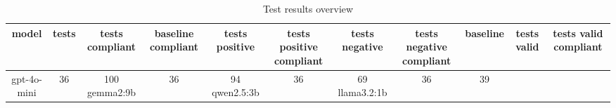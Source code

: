 
  \begin{table}[h!]
  \centering
  \begin{tabular}{|c|c|c|c|c|c|c|c|c|c|c|}
  \hline
  model & tests & tests compliant & baseline compliant & tests positive & tests positive compliant & tests negative & tests negative compliant & baseline & tests valid & tests valid compliant \\
  \hline
  gpt-4o-mini & 36 & 100%
\hline
gemma2:9b & 36 & 94%
\hline
qwen2.5:3b & 36 & 69%
\hline
llama3.2:1b & 36 & 39%
  \end{tabular}
  \caption{Test results overview}
  
  \end{table}
  